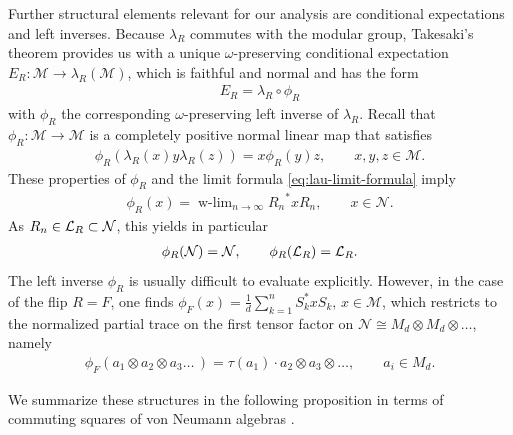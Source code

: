 \documentclass[12pt,a4paper]{amsart}
\numberwithin{equation}{section}
\theoremstyle{remark}
\DeclareMathOperator*{\wlim}{w-lim}
\newcommand{\ot}{\otimes}
\newcommand{\om}{\omega}
\newcommand{\la}{\lambda}
\newcommand{\CM}[0]{\mathcal{M}} \newcommand{\CN}[0]{\mathcal{N}}
\begin{document}
Further structural elements relevant for our analysis are conditional expectations and left inverses. Because $\la_R$ commutes with the modular group, Takesaki's theorem provides us with a unique $\om$-preserving conditional expectation $E_R:\CM\to\la_R(\CM)$, which is faithful and normal and has the form 
\begin{align}
 E_R=\la_R\circ\phi_R
\end{align}
with $\phi_R$ the corresponding $\om$-preserving left inverse of $\la_R$. Recall that $\phi_R:\CM\to\CM$ is a completely positive normal linear map that satisfies
\begin{align}\label{eq:phiRproperty}
 \phi_R(\la_R(x)y\la_R(z))=x\phi_R(y)z,\qquad x,y,z\in\CM.
\end{align}
These properties of $\phi_R$ and the limit formula \eqref{eq:lau-limit-formula} imply 
\begin{align}
 \phi_R(x)
 =
 \wlim_{n\to\infty}{R_n}^*xR_n,\qquad x\in\CN.
\end{align}
As $R_n\in\CL_R\subset\CN$, this yields in particular
\begin{align}\label{eq:phiRpreserves}
 \phi_R(\CN)=\CN,\qquad \phi_R(\CL_R)=\CL_R.
\end{align}
The left inverse $\phi_R$ is usually difficult to evaluate explicitly. However, in the case of the flip $R=F$, one finds $\phi_F(x)=\frac{1}{d}\sum_{k=1}^n S_k^* x S_k$, $x\in\CM$, which restricts to the normalized partial trace on the first tensor factor on $\CN\cong M_d\ot M_d\ot\ldots$, namely 
\begin{align}\label{eq:phiF}
    \phi_F(a_1\ot a_2\ot a_3\ldots\,)=\tau(a_1)\cdot a_2\ot a_3\ot\ldots, \qquad a_i\in M_d.
\end{align}


We summarize these structures in the following proposition in terms of commuting squares of von Neumann algebras \cite{GoodmandelaHarpeJones:1989}.
\end{document}
